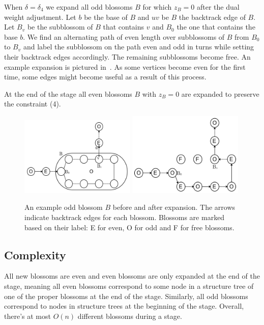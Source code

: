 When $\delta = \delta_4$ we expand all odd blossoms $B$ for which $z_B = 0$ after the dual weight adjustment. Let $b$ be the base of $B$ and $uv$ be $B$ the backtrack edge of $B$. Let $B_v$ be the subblossom of $B$ that contains $v$ and $B_0$ the one that contains the base $b$. We find an alternating path of even length over subblossoms of $B$ from $B_0$ to $B_v$ and label the subblossom on the path even and odd in turns while setting their backtrack edges accordingly. The remaining subblossoms become free. An example expansion is pictured in~. As some vertices become even for the first time, some edges might become useful as a result of this process.

At the end of the stage all even blossoms $B$ with $z_B = 0$ are expanded to preserve the constraint (4).

\begin{figure}
    \centering
    \includegraphics*[width=0.49\textwidth]{figures/Odd expansion.png}
    \includegraphics*[width=0.49\textwidth]{figures/Odd expanded.png}
    \caption{An example odd blossom $B$ before and after expansion. The arrows indicate backtrack edges for each blossom. Blossoms are marked based on their label: E for even, O for odd and F for free blossoms.}
\end{figure}

\subsection{Complexity}

All new blossoms are even and even blossoms are only expanded at the end of the stage, meaning all even blossoms correspond to some node in a structure tree of one of the proper blossoms at the end of the stage. Similarly, all odd blossoms correspond to nodes in structure trees at the beginning of the stage. Overall, there's at most $O(n)$ different blossoms during a stage. 

